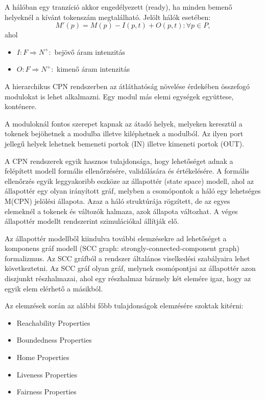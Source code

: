 \documentclass[12pt,a4paper]{book}
\begin{document}
A hálóban egy tranzíció akkor engedélyezett (ready), ha minden bemenő helyeknél a kívánt tokenszám megtalálható.   Jelölt hálók esetében:
$$M'(p)=M(p)-I(p,t)+O(p,t): \forall p\in P,$$ ahol 
\begin{itemize}
\item $I:F\Rightarrow N^+:$  bejövő áram intenzitás
\item $O:F\Rightarrow N^+:$ kimenő áram intenzitás

\end{itemize}
A hierarchikus CPN rendszerben az átláthatóság növelése érdekében összefogó modulokat is lehet alkalmazni. Egy modul más elemi egységek együttese, konténere. %

A moduloknál fontos szerepet kapnak az átadó helyek, melyeken keresztül a tokenek bejöhetnek a modulba illetve kiléphetnek a modulból. Az ilyen port jellegű helyek lehetnek bemeneti portok (IN) illetve kimeneti portok (OUT).  

A CPN rendszerek egyik hasznos tulajdonsága, hogy lehetőséget adnak a felépített modell formális ellenőrzésére, validálására és értékelésére. A formális ellenőrzés egyik leggyakoribb eszköze az állapottér (state space)  modell, ahol az állapottér egy olyan irányított gráf, melyben a csomópontok a háló egy lehetséges  M(CPN) jelölési állapota. Azaz a háló struktúrája rögzített, de az egyes elemeknél a tokenek és változók halmaza, azok állapota változhat. A véges állapottér modellt rendszerint szimulációkal állítják elő. 

Az állapottér modellből kiindulva további elemzésekre ad lehetőséget a komponens gráf modell (SCC graph:  strongly-connected-component graph) formalizmus. Az  SCC gráfból a rendszer általános viselkedési szabályaira lehet következtetni. Az SCC gráf olyan gráf, melynek csomópontjai  az állapottér azon diszjunkt részhalmazai, ahol egy részhalmaz bármely két elemére igaz, hogy az egyik elem  elérhető a másikból. 

Az elemzések során az alábbi főbb tulajdonságok elemzésére szoktak kitérni:
\begin{itemize}
\item Reachability Properties
\item Boundedness Properties
\item Home Properties 
\item Liveness Properties
\item Fairness Properties
\end{itemize}
\end{document}
